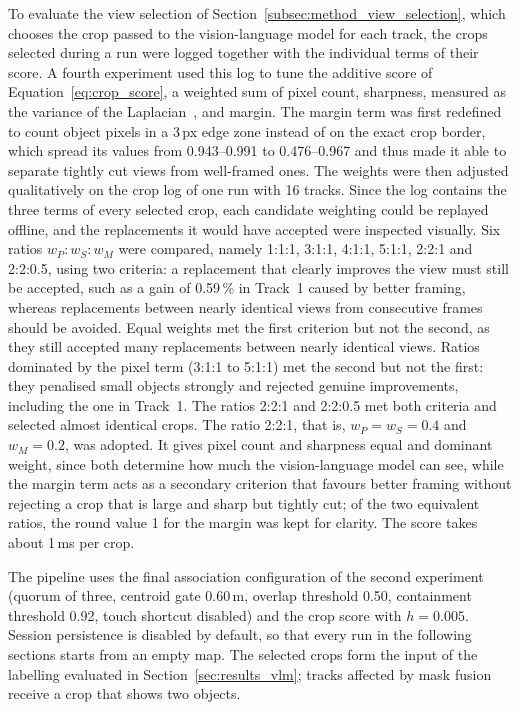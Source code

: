 {\small To evaluate the view selection of Section~\ref{subsec:method_view_selection}, which chooses the crop passed to the vision-language model for each track, the crops selected during a run were logged together with the individual terms of their score. A fourth experiment used this log to tune the additive score of Equation~\ref{eq:crop_score}, a weighted sum of pixel count, sharpness, measured as the variance of the Laplacian~\cite{pechpacheco2000laplacian}, and margin. The margin term was first redefined to count object pixels in a 3\,px edge zone instead of on the exact crop border, which spread its values from 0.943--0.991 to 0.476--0.967 and thus made it able to separate tightly cut views from well-framed ones. The weights were then adjusted qualitatively on the crop log of one run with 16 tracks. Since the log contains the three terms of every selected crop, each candidate weighting could be replayed offline, and the replacements it would have accepted were inspected visually. Six ratios $w_P : w_S : w_M$ were compared, namely 1:1:1, 3:1:1, 4:1:1, 5:1:1, 2:2:1 and 2:2:0.5, using two criteria: a replacement that clearly improves the view must still be accepted, such as a gain of 0.59\,\% in Track~1 caused by better framing, whereas replacements between nearly identical views from consecutive frames should be avoided. Equal weights met the first criterion but not the second, as they still accepted many replacements between nearly identical views. Ratios dominated by the pixel term (3:1:1 to 5:1:1) met the second but not the first: they penalised small objects strongly and rejected genuine improvements, including the one in Track~1. The ratios 2:2:1 and 2:2:0.5 met both criteria and selected almost identical crops. The ratio 2:2:1, that is, $w_P = w_S = 0.4$ and $w_M = 0.2$, was adopted. It gives pixel count and sharpness equal and dominant weight, since both determine how much the vision-language model can see, while the margin term acts as a secondary criterion that favours better framing without rejecting a crop that is large and sharp but tightly cut; of the two equivalent ratios, the round value 1 for the margin was kept for clarity. The score takes about 1\,ms per crop.\par}

{\small The pipeline uses the final association configuration of the second experiment (quorum of three, centroid gate 0.60\,m, overlap threshold 0.50, containment threshold 0.92, touch shortcut disabled) and the crop score with $h = 0.005$. Session persistence is disabled by default, so that every run in the following sections starts from an empty map. The selected crops form the input of the labelling evaluated in Section~\ref{sec:results_vlm}; tracks affected by mask fusion receive a crop that shows two objects.\par}























